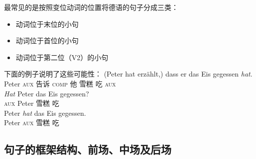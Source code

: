 最常见的是按照变位动词的位置将德语的句子分成三类：
\begin{itemize}
\item 动词位于末位的小句
\item 动词位于首位的小句
\item 动词位于第二位（V2）的小句
\end{itemize}
%
下面的例子说明了这些可能性：
\eal
\ex 
\gll (Peter hat erzählt,) dass er das Eis gegessen \emph{hat}.\\
     Peter  \textsc{aux} 告诉 \textsc{comp} 他  雪糕 吃 \textsc{aux}\\
\ex 
\gll \emph{Hat} Peter das Eis gegessen?\\
	 \textsc{aux} Peter  雪糕 吃\\
\ex 
\gll Peter \emph{hat} das Eis gegessen.\\
	 Peter \textsc{aux}  雪糕 吃\\
\zl

\subsection{句子的框架结构、前场、中场及后场}

